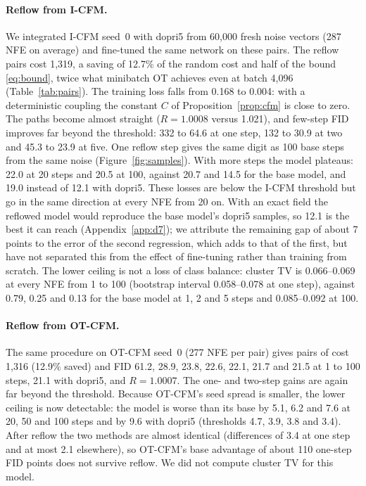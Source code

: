 \paragraph{Reflow from I-CFM.} We integrated I-CFM seed~0 with dopri5 from 60,000 fresh noise vectors (287 NFE on average) and fine-tuned the same network on these pairs. The reflow pairs cost 1,319, a saving of 12.7\% of the random cost and half of the bound \eqref{eq:bound}, twice what minibatch OT achieves even at batch 4,096 (Table~\ref{tab:pairs}). The training loss falls from 0.168 to 0.004: with a deterministic coupling the constant $C$ of Proposition~\ref{prop:cfm} is close to zero. The paths become almost straight ($R=1.0008$ versus 1.021), and few-step FID improves far beyond the threshold: 332 to 64.6 at one step, 132 to 30.9 at two and 45.3 to 23.9 at five. One reflow step gives the same digit as 100 base steps from the same noise (Figure~\ref{fig:samples}). With more steps the model plateaus: 22.0 at 20 steps and 20.5 at 100, against 20.7 and 14.5 for the base model, and 19.0 instead of 12.1 with dopri5. These losses are below the I-CFM threshold but go in the same direction at every NFE from 20 on. With an exact field the reflowed model would reproduce the base model's dopri5 samples, so 12.1 is the best it can reach (Appendix~\ref{app:d7}); we attribute the remaining gap of about 7 points to the error of the second regression, which adds to that of the first, but have not separated this from the effect of fine-tuning rather than training from scratch. The lower ceiling is not a loss of class balance: cluster TV is 0.066--0.069 at every NFE from 1 to 100 (bootstrap interval 0.058--0.078 at one step), against 0.79, 0.25 and 0.13 for the base model at 1, 2 and 5 steps and 0.085--0.092 at 100. %
\paragraph{Reflow from OT-CFM.} The same procedure on OT-CFM seed~0 (277 NFE per pair) gives pairs of cost 1,316 (12.9\% saved) and FID 61.2, 28.9, 23.8, 22.6, 22.1, 21.7 and 21.5 at 1 to 100 steps, 21.1 with dopri5, and $R=1.0007$. The one- and two-step gains are again far beyond the threshold. Because OT-CFM's seed spread is smaller, the lower ceiling is now detectable: the model is worse than its base by 5.1, 6.2 and 7.6 at 20, 50 and 100 steps and by 9.6 with dopri5 (thresholds 4.7, 3.9, 3.8 and 3.4). After reflow the two methods are almost identical (differences of 3.4 at one step and at most 2.1 elsewhere), so OT-CFM's base advantage of about 110 one-step FID points does not survive reflow. We did not compute cluster TV for this model. %

